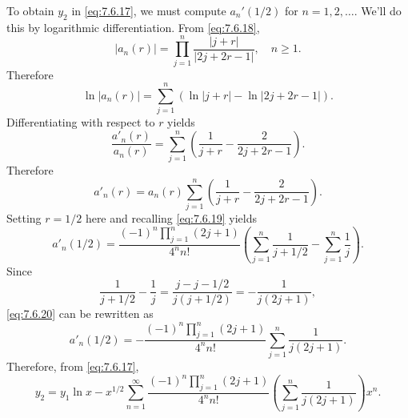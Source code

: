 \documentclass{ximera}
\begin{document}
\begin{example}
\begin{explanation}
To obtain $y_2$ in \eqref{eq:7.6.17}, we must compute $a_n'(1/2)$
for $n=1, 2,\dots$. We'll do this by logarithmic
differentiation.  From \eqref{eq:7.6.18},
$$
|a_n(r)|=\prod_{j=1}^n\frac{|j+r|}{|2j+2r-1|},\quad n\geq 1.
$$
Therefore
$$
\ln |a_n(r)|=\sum^n_{j=1} \left(\ln |j+r|-\ln|2j+2r-1|\right).
$$
Differentiating with respect to $r$ yields
$$
\frac{a'_n(r)}{a_n(r)}=\sum^n_{j=1} \left(\frac{1}{j+r}-\frac{2}{2j+2r-1}\right).
$$
Therefore
$$
a'_n(r)=a_n(r) \sum^n_{j=1} \left(\frac{1}{j+r}-\frac{2}{2j+2r-1}\right).
$$
Setting $r=1/2$ here and recalling \eqref{eq:7.6.19} yields
\begin{equation} \label{eq:7.6.20}
a'_n(1/2)=\frac{(-1)^n\prod_{j=1}^n(2j+1)}{4^nn!}\left(\sum_{j=1}^n\frac{1}{j+1/2}-\sum_{j=1}^n\frac{1}{j}\right).
\end{equation}
Since
$$
\frac{1}{j+1/2}-\frac{1}{j}=\frac{j-j-1/2}{j(j+1/2)}=-\frac{1}{j(2j+1)},
$$
 \eqref{eq:7.6.20} can be rewritten as
$$
a'_n(1/2)=-\frac{(-1)^n\prod_{j=1}^n(2j+1)}{4^nn!}
\sum_{j=1}^n\frac{1}{j(2j+1)}.
$$
Therefore, from \eqref{eq:7.6.17},
$$
y_2=y_1\ln
x-x^{1/2}\sum_{n=1}^\infty\frac{(-1)^n\prod_{j=1}^n(2j+1)}{4^nn!}
\left(\sum_{j=1}^n\frac{1}{j(2j+1)}\right)x^n.
$$
\end{explanation}
\end{example}
\end{document}
